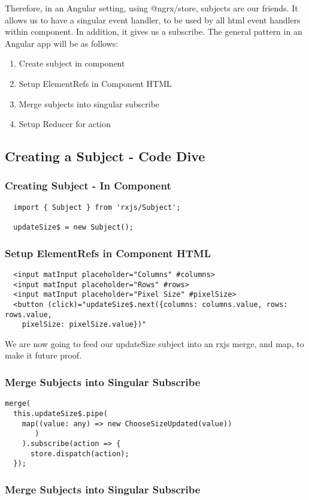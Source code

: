 Therefore, in an Angular setting, using @ngrx/store, subjects are our friends. It
allows us to have a singular event handler, to be used by all html event handlers
within component. In addition, it gives us a subscribe. The general pattern in
an Angular app will be as follows:
\begin{enumerate}
  \item Create subject in component
  \item Setup ElementRefs in Component HTML
  \item Merge subjects into singular subscribe
  \item Setup Reducer for action
\end{enumerate}

\subsection{ Creating a Subject - Code Dive }

\subsubsection{ Creating Subject - In Component }
\begin{lstlisting}
  import { Subject } from 'rxjs/Subject';

  updateSize$ = new Subject();
\end{lstlisting}

\subsubsection{ Setup ElementRefs in Component HTML }
\begin{verbatim}
  <input matInput placeholder="Columns" #columns>
  <input matInput placeholder="Rows" #rows>
  <input matInput placeholder="Pixel Size" #pixelSize>
  <button (click)="updateSize$.next({columns: columns.value, rows: rows.value,
    pixelSize: pixelSize.value})"
\end{verbatim}

We are now going to feed our updateSize subject into an rxjs merge, and map,
to make it future proof.

\subsubsection{ Merge Subjects into Singular Subscribe }

\begin{lstlisting}
merge(
  this.updateSize$.pipe(
    map((value: any) => new ChooseSizeUpdated(value))
       )
    ).subscribe(action => {
      store.dispatch(action);
  });
\end{lstlisting}

\subsubsection{ Merge Subjects into Singular Subscribe }
